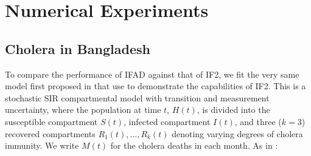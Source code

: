 \documentclass{article}
\begin{document}
\section{Numerical Experiments}

\subsection{Cholera in Bangladesh}

To compare the performance of IFAD against that of IF2, we fit the very same model first proposed in \cite{king08} that \cite{ionides15} use to demonstrate the capabilities of IF2. This is a stochastic SIR compartmental model with transition and measurement uncertainty, where the population at time $t$, $H(t)$, is divided into the susceptible compartment $S(t)$, infected compartment $I(t)$, and three ($k=3$) recovered compartments $R_1(t), ..., R_k(t)$ denoting varying degrees of cholera immunity. We write $M(t)$ for the cholera deaths in each month. As in \cite{ionides15}:
\end{document}
